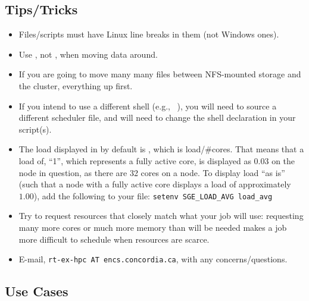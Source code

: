 \documentclass{easychair}
\begin{document}
\subsection{Tips/Tricks}
\label{sect:tips}

\begin{itemize}
\item
Files/scripts must have Linux line breaks in them (not Windows ones).
\item
Use , not , when moving data around. 
\item
If you are going to move many many files between NFS-mounted storage and the 
cluster,  everything up first. 
\item
If you intend to use a different shell (e.g., ~\cite{aosa-book-vol1-bash}),
you will need to source a different scheduler file, and will need to 
change the shell declaration in your script(s).
\item
The load displayed in  by default is , which is
load/\#cores. That means that a load of, ``1'', which represents a fully active 
core, is displayed as $0.03$ on the node in question, as there are 32 cores 
on a node. To display load ``as is'' (such that a node with a fully active 
core displays a load of approximately $1.00$), add the following to your
 file: \texttt{setenv SGE\_LOAD\_AVG load\_avg}

\item
Try to request resources that closely match what your job will use: 
requesting many more cores or much more memory than will be needed makes a 
job more difficult to schedule when resources are scarce.

\item
E-mail, \texttt{rt-ex-hpc AT encs.concordia.ca}, with any concerns/questions.
\end{itemize}

\subsection{Use Cases}
\label{sect:cases}
\end{document}
